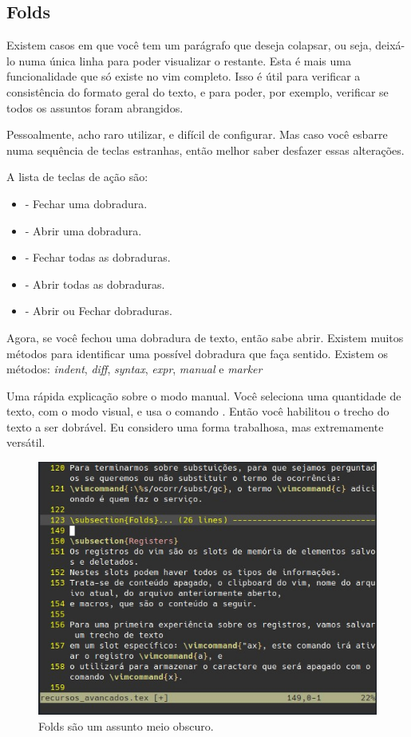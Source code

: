 \subsection{Folds}
Existem casos em que você tem um parágrafo que deseja colapsar, ou seja, deixá-lo numa única linha para poder visualizar o restante.
Esta é mais uma funcionalidade que só existe no vim completo.
Isso é útil para verificar a consistência do formato geral do texto, e para poder, por exemplo, verificar se todos os assuntos foram abrangidos.

Pessoalmente, acho raro utilizar, e difícil de configurar.
Mas caso você esbarre numa sequência de teclas estranhas, então melhor saber desfazer essas alterações.

A lista de teclas de ação são:
\begin{itemize}
    \item {} - Fechar uma dobradura.
    \item {} - Abrir uma dobradura.
    \item {} - Fechar todas as dobraduras.
    \item {} - Abrir todas as dobraduras.
    \item {} - Abrir ou Fechar dobraduras.
\end{itemize}

Agora, se você fechou uma dobradura de texto, então sabe abrir.
Existem muitos métodos para identificar uma possível dobradura que faça sentido.
Existem os métodos: \textit{indent}, \textit{diff}, \textit{syntax}, \textit{expr}, \textit{manual} e \textit{marker}

Uma rápida explicação sobre o modo manual.
Você seleciona uma quantidade de texto, com o modo visual, e usa o comando .
Então você habilitou o trecho do texto a ser dobrável.
Eu considero uma forma trabalhosa, mas extremamente versátil.

\begin{figure}[!htb]
\centering
\includegraphics[scale=0.70]{recursos_avancados/Fold_metodo_manual.jpg}
\caption{Folds são um assunto meio obscuro.}
\end{figure}

